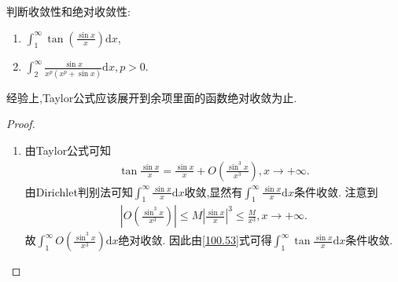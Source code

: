 \documentclass[../../main.tex]{subfiles}%
\begin{document}
\begin{example}
判断收敛性和绝对收敛性:
\begin{enumerate}
\item \(\int_{1}^{\infty}\tan\left(\frac{\sin x}{x}\right)\mathrm{d}x\),

\item \(\int_{2}^{\infty}\frac{\sin x}{x^p(x^p + \sin x)}\mathrm{d}x,p > 0\). 
\end{enumerate}
\end{example}
\begin{note}
经验上,Taylor公式应该展开到余项里面的函数绝对收敛为止.
\end{note}
\begin{proof}
\begin{enumerate}
\item 由Taylor公式可知
\begin{align}
\tan\frac{\sin x}{x}=\frac{\sin x}{x}+O\left(\frac{\sin^3 x}{x^3}\right),x\rightarrow +\infty. \label{100.53}
\end{align}
由Dirichlet判别法可知\(\int_{1}^{\infty}\frac{\sin x}{x}\mathrm{d}x\)收敛,显然有\(\int_{1}^{\infty}\frac{\sin x}{x}\mathrm{d}x\)条件收敛. 注意到
\begin{align*}
\left|O\left(\frac{\sin^3 x}{x^3}\right)\right|\leqslant M\left|\frac{\sin x}{x}\right|^3\leqslant\frac{M}{x^3},x\rightarrow +\infty.
\end{align*}
故\(\int_{1}^{\infty}O\left(\frac{\sin^3 x}{x^3}\right)\mathrm{d}x\)绝对收敛. 因此由\eqref{100.53}式可得\(\int_{1}^{\infty}\tan\frac{\sin x}{x}\mathrm{d}x\)条件收敛.


\end{enumerate}
\end{proof}
\end{document}
